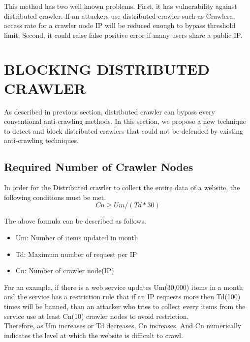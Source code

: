 \documentclass[sigconf,anonymous=true]{acmart}
\begin{document}
\begin{enumerate}
This method has two well known problems. 
First, it has vulnerability against distributed crawler. If an attackers use distributed crawler such as Crawlera, access rate for a crawler node IP will be reduced enough to bypass threshold limit.
Second, it could raise false positive error if many users share a public IP.
\newline


\end{enumerate}


%
%
\section{BLOCKING DISTRIBUTED CRAWLER}
As described in previous section, distributed crawler can bypass every conventional anti-crawling methods. In this section, we propose a new technique to detect and block distributed crawlers that could not be defended by existing anti-crawling techniques.

\subsection{Required Number of Crawler Nodes}
In order for the Distributed crawler to collect the entire data of a website, the following conditions must be met.\\
\begin{displaymath}
Cn \geq Um / (Td * 30) 
\end{displaymath}

The above formula can be described as follows.

\begin{itemize}
\item Um: Number of items updated in month
\item Td: Maximum number of request per IP
\item Cn: Number of crawler node(IP)
\end{itemize}

For an example, if there is a web service updates Um(30,000) items in a month and the service has a restriction rule that if an IP requests more then Td(100) times will be banned, than an attacker who tries to collect every items from the service use at least Cn(10) crawler nodes to avoid restriction.\\
Therefore, as Um increases or Td decreases, Cn increases. And Cn numerically indicates the level at which the website is difficult to crawl.
\end{document}

